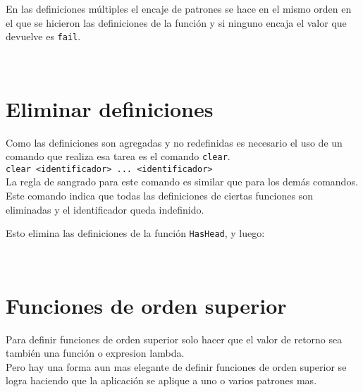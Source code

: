       En las definiciones múltiples el encaje de patrones se hace en el mismo orden en el que se hicieron las definiciones de la función y si ninguno encaja el valor que devuelve es \texttt{fail}.
      \\
      
      \begin{fxcode}
         \\
      \end{fxcode}
      
   \section{Eliminar definiciones}
      Como las definiciones son agregadas y no redefinidas es necesario el uso de un comando que realiza esa tarea es el comando \texttt{clear}.
      \\
      
      \texttt{clear~<identificador>~...~<identificador>}
      \\
      
      La regla de sangrado para este comando es similar que para los demás comandos.
      \\
      
      Este comando indica que todas las definiciones de ciertas funciones son eliminadas y el identificador queda indefinido.
      
      \begin{fxcode}
      \end{fxcode}
      
      Esto elimina las definiciones de la función \texttt{HasHead}, y luego:
      
      \begin{fxcode}
         \\
          
      \end{fxcode}
      
   \section{Funciones de orden superior}
      Para definir funciones de orden superior solo hacer que el valor de retorno sea también una función o expresion lambda.
      \\
      
      Pero hay una forma aun mas elegante de definir funciones de orden superior se logra haciendo que la aplicación se aplique a uno o varios patrones mas.
      \\
      
